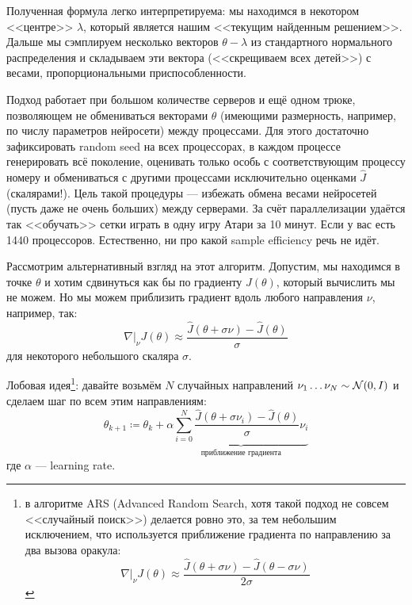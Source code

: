 Полученная формула легко интерпретируема: мы находимся в некотором <<центре>> $\lambda$, который является нашим <<текущим найденным решением>>. Дальше мы сэмплируем несколько векторов $\theta - \lambda$ из стандартного нормального распределения и складываем эти вектора (<<скрещиваем всех детей>>) с весами, пропорциональными приспособленности.


\begin{remark}
Подход работает при большом количестве серверов и ещё одном трюке, позволяющем не обмениваться векторами $\theta$ (имеющими размерность, например, по числу параметров нейросети) между процессами. Для этого достаточно зафиксировать random seed на всех процессорах, в каждом процессе генерировать всё поколение, оценивать только особь с соответствующим процессу номеру и обмениваться с другими процессами исключительно оценками $\hat{J}$ (скалярами!). Цель такой процедуры --- избежать обмена весами нейросетей (пусть даже не очень больших) между серверами. За счёт параллелизации удаётся так <<обучать>> сетки играть в одну игру Атари за 10 минут. Если у вас есть 1440 процессоров. Естественно, ни про какой sample efficiency речь не идёт. 
\end{remark}

\begin{example}[OpenAI-ES]
\begin{center}
\end{center}
\end{example}

Рассмотрим альтернативный взгляд на этот алгоритм. Допустим, мы находимся в точке $\theta$ и хотим сдвинуться как бы по градиенту $J(\theta)$, который вычислить мы не можем. Но мы можем приблизить градиент вдоль любого направления $\nu$, например, так:
$$ \left. \nabla \right|_{\nu} J(\theta) \approx \frac{\hat{J}(\theta + \sigma \nu) - \hat{J}(\theta)}{\sigma}$$
для некоторого небольшого скаляра $\sigma$.

Лобовая идея\footnote{в алгоритме ARS (Advanced Random Search, хотя такой подход не совсем <<случайный поиск>>) делается ровно это, за тем небольшим исключением, что используется приближение градиента по направлению за два вызова оракула:
$$ \left. \nabla \right|_{\nu} J(\theta) \approx \frac{\hat{J}(\theta + \sigma \nu) - \hat{J}(\theta - \sigma \nu)}{2\sigma}$$}: давайте возьмём $N$ случайных направлений $\nu_1 \dots \nu_N \sim \mathcal{N}(0, I)$ и сделаем шаг по всем этим направлениям:
\begin{equation}\label{ars}
\theta_{k+1} \coloneqq \theta_k + \alpha \underbrace{\sum_{i=0}^N \frac{\hat{J}(\theta + \sigma \nu_i) - \hat{J}(\theta)}{\sigma}\nu_i}_{\text{приближение градиента}}
\end{equation}
где $\alpha$ --- learning rate.

